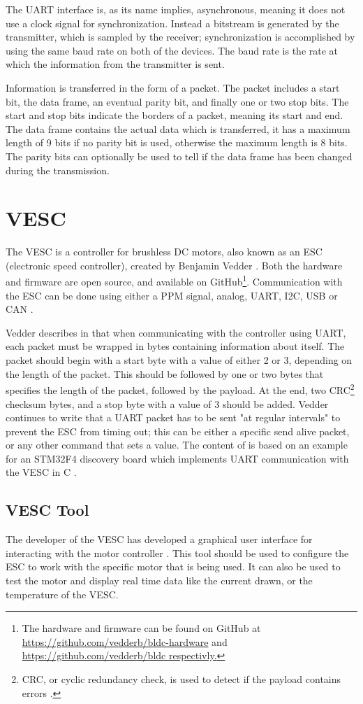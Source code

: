 The UART interface is, as its name implies, asynchronous, meaning it does not use a clock signal for synchronization. Instead a bitstream is generated by the transmitter, which is sampled by the receiver; synchronization is accomplished by using the same baud rate on both of the devices.
The baud rate is the rate at which the information from the transmitter is sent.

Information is transferred in the form of a packet. The packet includes a start bit, the data frame, an eventual parity bit, and finally one or two stop bits. The start and stop bits indicate the borders of a packet, meaning its start and end. The data frame contains the actual data which is transferred, it has a maximum length of 9 bits if no parity bit is used, otherwise the maximum length is 8 bits. The parity bits can optionally be used to tell if the data frame has been changed during the transmission.

\section{VESC} \label{theory:vesc}
The VESC is a controller for brushless DC motors, also known as an ESC (electronic speed controller), created by Benjamin Vedder \cite{Vedder2014AESC}. Both the hardware and firmware are open source, and available on GitHub\footnote{The hardware and firmware can be found on GitHub at \url{https://github.com/vedderb/bldc-hardware} and \url{https://github.com/vedderb/bldc respectivly.}}. Communication with the ESC can be done using either a PPM signal, analog, UART, I2C, USB or CAN \cite{Vedder2016VESCESC}.

Vedder describes in \cite{Vedder2015CommunicatingUART} that when communicating with the controller using UART, each packet must be wrapped in bytes containing information about itself. The packet should begin with a start byte with a value of either 2 or 3, depending on the length of the packet. This should be followed by one or two bytes that specifies the length of the packet, followed by the payload. At the end, two CRC\footnote{CRC, or cyclic redundancy check, is used to detect if the payload contains errors \cite{Technopedia2020WhatCRC}.} checksum bytes, and a stop byte with a value of 3 should be added. Vedder continues to write that a UART packet has to be sent "at regular intervals" to prevent the ESC from timing out; this can be either a specific send alive packet, or any other command that sets a value. The content of \cite{Vedder2015CommunicatingUART} is based on an example for an STM32F4 discovery board which implements UART communication with the VESC in C \cite{Vedder2018Vedderb/bldc_uart_comm_stm32f4_discovery:UART}.

\subsection{VESC Tool}
The developer of the VESC has developed a graphical user interface for interacting with the motor controller \cite{Vedder2016VESCESC}. This tool should be used to configure the ESC to work with the specific motor that is being used. It can also be used to test the motor and display real time data like the current drawn, or the temperature of the VESC.
